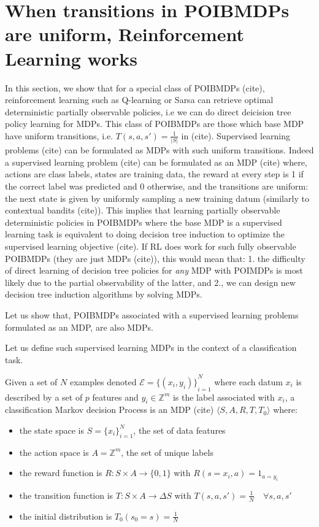 \chapter{When transitions in POIBMDPs are uniform, Reinforcement Learning works}\label{sec:pomdp-classif}
In this section, we show that for a special class of POIBMDPs (cite), reinforcement learning such as Q-learning or Sarsa can retrieve optimal deterministic partially observable policies, i.e we can do direct deicision tree policy learning for MDPs.
This class of POIBMDPs are those which base MDP have uniform transitions, i.e. $T(s, a, s') = \frac{1}{|S|}$ in (cite).
Supervised learning problems (cite) can be formulated as MDPs with such uniform transitions.
Indeed a supervised learning problem (cite) can be formulated as an MDP (cite) where, actions are class labels, states are training data, the reward at every step is 1 if the correct label was predicted and 0 otherwise, and the transitions are uniform: the next state is given by uniformly sampling a new training datum (similarly to contextual bandits (cite)). 
This implies that learning partially observable deterministic policies in POIBMDPs where the base MDP is a supervised learning task is equivalent to doing decision tree induction to optimize the supervised learning objective (cite).
If RL does work for such fully observable POIBMDPs (they are just MDPs (cite)), this would mean that: 1. the difficulty of direct learning of decision tree policies for \textit{any} MDP with POIMDPs is most likely due to the partial observability of the latter, and 2., we can design new decision tree induction algorithms by solving MDPs.

Let us show that, POIBMDPs associated with a supervised learning problems formulated as an MDP, are also MDPs.

Let us define such supervised learning MDPs in the context of a classification task.
\begin{definition}
    Given a set of $N$ examples denoted $\mathcal{E} = {\{(x_i, y_i)\}}_{i=1}^N$ where each datum $x_i$ is described by a set of $p$ features and $y_i \in \mathbb{Z}^m$ is the label associated with $x_i$, a classification Markov decision Process is an MDP (cite) $\langle S, A, R, T, T_0 \rangle$ where:
    \begin{itemize}
        \item the state space is $S={\{x_i\}}_{i=1}^N$, the set of data features
        \item the action space is $A=\mathbb{Z}^m$, the set of unique labels
        \item the reward function is $R:S\times A \rightarrow \{0, 1\}$ with $R(s=x_i, a) = 1_{a=y_i}$
        \item the transition function is $T:S\times A \rightarrow \Delta S$ with $T(s, a, s') = \frac{1}{N} \quad \forall s, a, s'$
        \item the initial distribution is $T_0(s_0 = s) = \frac{1}{N}$
    \end{itemize}
\end{definition}

